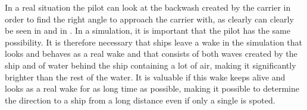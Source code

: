 In a real situation the pilot can look at the backwash created by the carrier in order to find the right angle to approach the carrier with, as clearly can clearly be seen in  and in \citep{alivewithpassion2007}. In a simulation, it is important that the pilot has the same possibility. It is therefore necessary that ships leave a wake in the simulation that looks and behaves as a real wake and that consists of both waves created by the ship and of water behind the ship containing a lot of air, making it significantly brighter than the rest of the water. It is valuable if this wake keeps alive and looks as a real wake for as long time as possible, making it possible to determine the direction to a ship from a long distance even if only a single  is spoted.